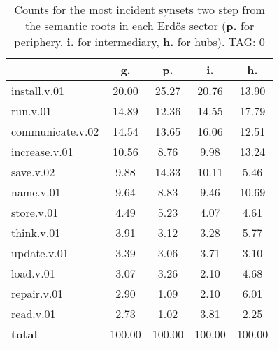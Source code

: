 \begin{table}[h!]
\begin{center}
\begin{tabular}{| l | c | c | c | c |}\hline
 & g. & p. & i. & h. \\\hline
install.v.01 & 20.00  & 25.27  & 20.76  & 13.90 \\\hline
run.v.01 & 14.89  & 12.36  & 14.55  & 17.79 \\\hline
communicate.v.02 & 14.54  & 13.65  & 16.06  & 12.51 \\\hline
increase.v.01 & 10.56  & 8.76  & 9.98  & 13.24 \\\hline
save.v.02 & 9.88  & 14.33  & 10.11  & 5.46 \\\hline
name.v.01 & 9.64  & 8.83  & 9.46  & 10.69 \\\hline
store.v.01 & 4.49  & 5.23  & 4.07  & 4.61 \\\hline
think.v.01 & 3.91  & 3.12  & 3.28  & 5.77 \\\hline
update.v.01 & 3.39  & 3.06  & 3.71  & 3.10 \\\hline
load.v.01 & 3.07  & 3.26  & 2.10  & 4.68 \\\hline
repair.v.01 & 2.90  & 1.09  & 2.10  & 6.01 \\\hline
read.v.01 & 2.73  & 1.02  & 3.81  & 2.25 \\\hline
{{\bf total}} & 100.00  & 100.00  & 100.00  & 100.00 \\\hline
\end{tabular}
\caption{Counts for the most incident synsets two step from the semantic roots in each Erd\"os sector ({\bf p.} for periphery, {\bf i.} for intermediary, {\bf h.} for hubs). TAG: 0}
\end{center}
\end{table}